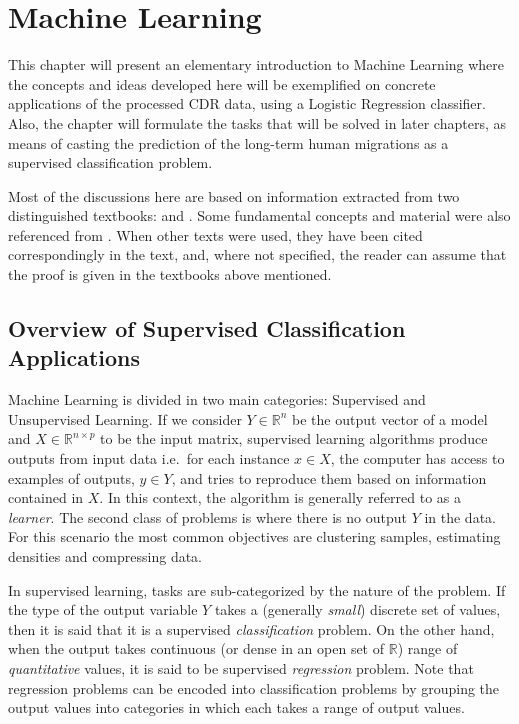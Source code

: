 
\chapter{Machine Learning}\label{ch:machineLearning}

This chapter will present an elementary introduction to Machine Learning where the concepts and ideas developed here will be exemplified on concrete applications of the processed CDR data, using a Logistic Regression classifier.
Also, the chapter will formulate the tasks that will be solved in later chapters, as means of casting the prediction of the long-term human migrations as a supervised classification problem.

Most of the discussions here are based on information extracted from two distinguished textbooks: \citep{bishop-patternRecognition} and \citep{hastie-elemstatslearn}.
Some fundamental concepts and material were also referenced from \citep{scikit-learn}.
When other texts were used, they have been cited correspondingly in the text, and, where not specified, the reader can assume that the proof is given in the textbooks above mentioned.

\section{Overview of Supervised Classification Applications}\label{section-supervised-learning}


Machine Learning is divided in two main categories: Supervised and Unsupervised Learning.
If we consider $Y \in \mathbb{R}^n$ be the output vector of a model and $X \in \mathbb{R}^{n \times p}$ to be the input matrix, supervised learning algorithms produce outputs from input data i.e.\ for each instance $x \in X$, the computer has access to examples of outputs, $y \in Y$, and tries to reproduce them based on information contained in $X$.
In this context, the algorithm is generally referred to as a \textit{learner}.
The second class of problems is where there is no output $Y$ in the data.
For this scenario the most common objectives are clustering samples, estimating densities and compressing data.

In supervised learning, tasks are sub-categorized by the nature of the problem.
If the type of the output variable $Y$ takes a (generally \textit{small}) discrete set of values, then it is said that it is a supervised \textit{classification} problem.
On the other hand, when the output takes continuous (or dense in an open set of $\mathbb{R}$) range of \textit{quantitative} values, it is said to be supervised \textit{regression} problem.
Note that regression problems can be encoded into classification problems by grouping the output values into categories in which each takes a range of output values.

